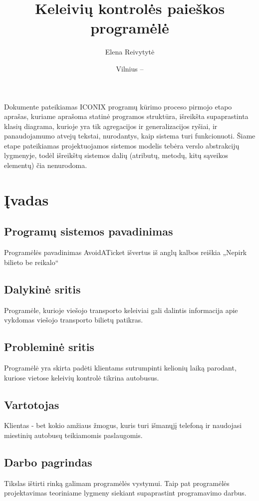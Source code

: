 \documentclass{VUMIFPSkursinis}
\title{Keleivių kontrolės paieškos programėlė}
\author{Elena Reivytytė}
\date{Vilnius – \the\year}
\begin{document}
\maketitle

Dokumente pateikiamas ICONIX programų kūrimo proceso pirmojo etapo aprašas, kuriame aprašoma statinė programos struktūra, išreikšta supaprastinta klasių diagrama, kurioje yra tik agregacijos ir generalizacijos ryšiai, ir panaudojamumo atvejų tekstai, nurodantys, kaip sistema turi funkcionuoti. Šiame etape pateikiamas projektuojamos sistemos modelis tebėra verslo abstrakcijų lygmenyje, todėl išreikštų sistemos dalių (atributų, metodų, kitų sąveikos elementų) čia nenurodoma.

\tableofcontents

\section{Įvadas}

\subsection{Programų sistemos pavadinimas}
Programėlės pavadinimas AvoidATicket išvertus iš anglų kalbos reiškia „Nepirk bilieto be reikalo“
\subsection{Dalykinė sritis}
Programėle, kurioje viešojo transporto keleiviai gali dalintis informacija apie vykdomas viešojo transporto bilietų patikras.
\subsection{Probleminė sritis}
Programėlė yra skirta padėti klientams sutrumpinti kelionių laiką parodant, kuriose vietose keleivių kontrolė tikrina autobusus.
\subsection{Vartotojas}
Klientas - bet kokio amžiaus žmogus, kuris turi išmanųjį telefoną ir naudojasi miestinių autobusų teikiamomis paslaugomis.
\subsection{Darbo pagrindas}
Tikslas ištirti rinką galimam programėlės vystymui. Taip pat programėlės projektavimas teoriniame lygmeny siekiant supaprastint programavimo darbus.
\end{document}
